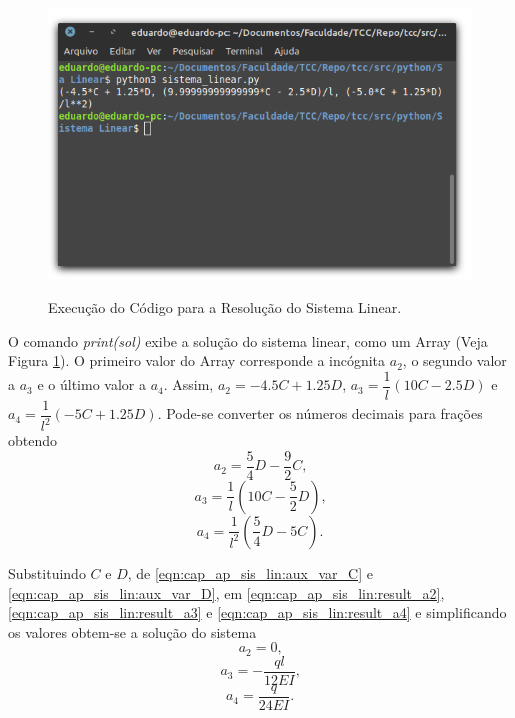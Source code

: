 \documentclass[
	12pt,				%
	openright,			%
    twoside,			%
	a4paper,			%
	english,			%
	french,				%
	spanish,			%
	brazil				%
	]{abntex2}
\numberwithin{lema}{chapter}
\numberwithin{teorema}{chapter}
\numberwithin{definicao}{chapter}
\numberwithin{exemplo}{chapter}
\numberwithin{figure}{chapter}
\begin{document}
\begin{apendicesenv}
{	\begin{figure}[h]
		\caption{Execução do Código para a Resolução do Sistema Linear.}
		\centering
		\includegraphics[scale=2.5]{../figuras/code/code_solve_sis_linear.png}
		\label{fig:code_solve_sis_linear}
	\end{figure}
	
	O comando \textit{print(sol)} exibe a solução do sistema linear, como um Array (Veja Figura \ref{fig:code_solve_sis_linear}). O primeiro valor do Array corresponde a incógnita $a_2$, o segundo valor a $a_3$ e o último valor a $a_4$. Assim, $a_2=-4.5C+1.25D$, $a_3=\dfrac{1}{l}(10C-2.5D)$ e $a_4=\dfrac{1}{l^2}(-5C+1.25D)$. Pode-se converter os números decimais para frações obtendo
	\begin{equation}
		\label{eqn:cap_ap_sis_lin:result_a2}
		a_2=\frac{5}{4}D-\frac{9}{2}C
		\text{,}
	\end{equation}
	\begin{equation}
		\label{eqn:cap_ap_sis_lin:result_a3}
		a_3=\frac{1}{l}\left (
			10C - \frac{5}{2} D
		\right ) \text{,}
	\end{equation}
	\begin{equation}
		\label{eqn:cap_ap_sis_lin:result_a4}
		a_4=\frac{1}{l^2}\left (
			\frac{5}{4}D-5C
		\right ) \text{.}
	\end{equation}
	
	Substituindo $C$ e $D$, de \eqref{eqn:cap_ap_sis_lin:aux_var_C} e \eqref{eqn:cap_ap_sis_lin:aux_var_D}, em \eqref{eqn:cap_ap_sis_lin:result_a2}, \eqref{eqn:cap_ap_sis_lin:result_a3} e \eqref{eqn:cap_ap_sis_lin:result_a4} e simplificando os valores obtem-se a solução do sistema
	$$
		a_2 = 0\text{,}
	$$
	$$
		a_3 = -\frac{ql}{12EI}\text{,}
	$$
	$$
		a_4 = \frac{q}{24EI}\text{.}
	$$

}
\end{apendicesenv}
\end{document}
